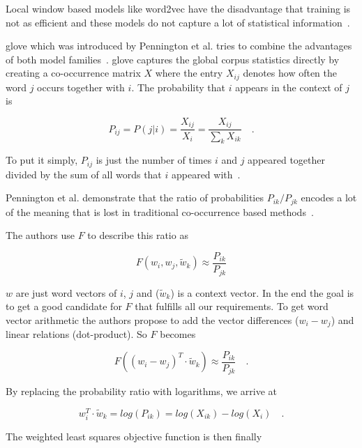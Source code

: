 Local window based models like word2vec have the disadvantage that training is not as efficient and these models do not capture a lot of statistical information~\cite{Pennington2014a}. 
\medskip

\gls{glove} which was introduced by Pennington et al. tries to combine the advantages of both model families~\cite{Pennington2014a}. \gls{glove} captures the global corpus statistics directly by creating a co-occurrence matrix $X$ where the entry $X_{ij}$ denotes how often the word $j$ occurs together with $i$. The probability that $i$ appears in the context of $j$ is 

\begin{equation}
    P_{ij}=P(j|i)=\frac{X_{ij}}{X_i}=\frac{X_{ij}}{\sum_k X_{ik}}\quad.
\end{equation}

To put it simply, $P_{ij}$ is just the number of times $i$ and $j$ appeared together divided by the sum of all words that $i$ appeared with~\cite{Pennington2014a}.

Pennington et al. demonstrate that the ratio of probabilities $P_{ik} / P_{jk}$  encodes a lot of the meaning that is lost in traditional co-occurrence based methods~\cite{Pennington2014a}.
\medskip

The authors use $F$ to describe this ratio as

\begin{equation}
    F(w_i, w_j, \widetilde{w}_k) \approx \frac{P_{ik}}{P_{jk}}
\end{equation}

$w$ are just word vectors of $i$, $j$ and {($\widetilde{w}_k$)} is a context vector. In the end the goal is to get a good candidate for $F$ that fulfills all our requirements. To get word vector arithmetic the authors propose to add the vector differences {($w_i - w_j$)} and linear relations {(dot-product)}. So $F$ becomes

\begin{equation}
    F((w_i - w_j)^T \cdot \widetilde{w}_k) \approx \frac{P_{ik}}{P_{jk}} \quad .
\end{equation}

By replacing the probability ratio with logarithms, we arrive at

\begin{equation}
    w_i^T \cdot \widetilde{w}_k = log(P_{ik}) = log(X_{ik}) - log(X_i) \quad .
\end{equation}

The weighted least squares objective function is then finally

